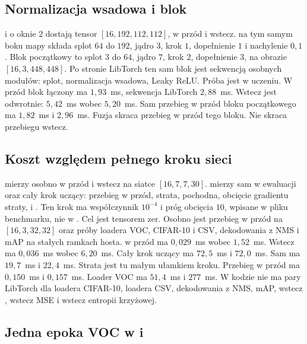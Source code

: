 \subsection{Normalizacja wsadowa i blok }

 i  o oknie \(2\) dostają tensor \([16, 192, 112, 112]\), w przód i wstecz.  na tym samym boku mapy składa splot \(64\) do \(192\), jądro \(3\), krok \(1\), dopełnienie \(1\) i nachylenie \(0{,}1\). Blok początkowy to splot \(3\) do \(64\), jądro \(7\), krok \(2\), dopełnienie \(3\), na obrazie \([16, 3, 448, 448]\). Po stronie LibTorch ten sam blok jest sekwencją osobnych modułów: splot, normalizacja wsadowa, Leaky ReLU. Próba jest w uczeniu. W przód blok łączony ma \(1{,}93\)~ms, sekwencja LibTorch \(2{,}88\)~ms. Wstecz jest odwrotnie: \(5{,}42\)~ms wobec \(5{,}20\)~ms. Sam przebieg w przód bloku początkowego ma \(1{,}82\)~ms i \(2{,}96\)~ms. Fuzja skraca przebieg w przód tego bloku. Nie skraca przebiegu wstecz.

\subsection{Koszt  względem pełnego kroku sieci}

 mierzy osobno  w przód i wstecz na siatce \([16, 7, 7, 30]\).  mierzy sam  w ewaluacji oraz cały krok uczący: przebieg w przód, strata, pochodna, obcięcie gradientu straty,  i . Ten krok ma współczynnik \(10^{-4}\) i próg obcięcia \(10\), wpisane w pliku benchmarku, nie w . Cel jest tensorem zer. Osobno jest przebieg w przód  na \([16, 3, 32, 32]\) oraz próby loadera VOC, CIFAR-10 i CSV, dekodowania z NMS i mAP na stałych ramkach hosta.  w przód ma \(0{,}029\)~ms wobec \(1{,}52\)~ms. Wstecz ma \(0{,}036\)~ms wobec \(6{,}20\)~ms. Cały krok uczący ma \(72{,}5\)~ms i \(72{,}0\)~ms. Sam  ma \(19{,}7\)~ms i \(22{,}4\)~ms. Strata jest tu małym ułamkiem kroku. Przebieg w przód  ma \(0{,}150\)~ms i \(0{,}157\)~ms. Loader VOC ma \(51{,}4\)~ms i \(277\)~ms. W kodzie nie ma pary LibTorch dla loadera CIFAR-10, loadera CSV, dekodowania z NMS, mAP, wstecz , wstecz MSE i wstecz entropii krzyżowej.

\subsection{Jedna epoka VOC w  i }

